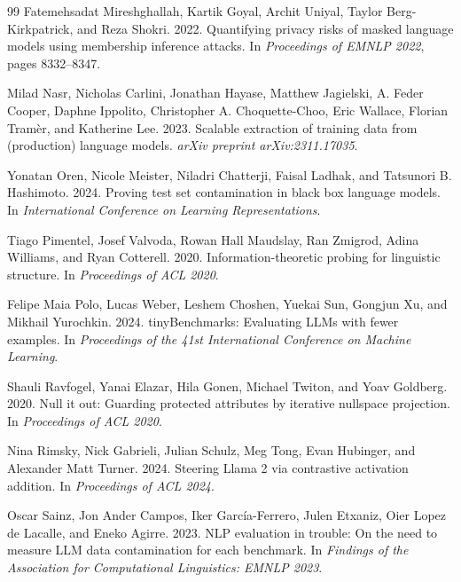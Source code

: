 \documentclass[10pt,twocolumn,letterpaper]{article}
\begin{document}
\begin{thebibliography}{99}
Fatemehsadat Mireshghallah, Kartik Goyal, Archit Uniyal, Taylor Berg-Kirkpatrick, and Reza Shokri. 2022.
Quantifying privacy risks of masked language models using membership inference attacks.
In \emph{Proceedings of EMNLP 2022}, pages 8332--8347.

Milad Nasr, Nicholas Carlini, Jonathan Hayase, Matthew Jagielski, A. Feder Cooper, Daphne Ippolito, Christopher A. Choquette-Choo, Eric Wallace, Florian Tram\`er, and Katherine Lee. 2023.
Scalable extraction of training data from (production) language models.
\emph{arXiv preprint arXiv:2311.17035}.

Yonatan Oren, Nicole Meister, Niladri Chatterji, Faisal Ladhak, and Tatsunori B. Hashimoto. 2024.
Proving test set contamination in black box language models.
In \emph{International Conference on Learning Representations}.

Tiago Pimentel, Josef Valvoda, Rowan Hall Maudslay, Ran Zmigrod, Adina Williams, and Ryan Cotterell. 2020.
Information-theoretic probing for linguistic structure.
In \emph{Proceedings of ACL 2020}.

Felipe Maia Polo, Lucas Weber, Leshem Choshen, Yuekai Sun, Gongjun Xu, and Mikhail Yurochkin. 2024.
tinyBenchmarks: Evaluating LLMs with fewer examples.
In \emph{Proceedings of the 41st International Conference on Machine Learning}.

Shauli Ravfogel, Yanai Elazar, Hila Gonen, Michael Twiton, and Yoav Goldberg. 2020.
Null it out: Guarding protected attributes by iterative nullspace projection.
In \emph{Proceedings of ACL 2020}.

Nina Rimsky, Nick Gabrieli, Julian Schulz, Meg Tong, Evan Hubinger, and Alexander Matt Turner. 2024.
Steering Llama 2 via contrastive activation addition.
In \emph{Proceedings of ACL 2024}.

Oscar Sainz, Jon Ander Campos, Iker Garc\'ia-Ferrero, Julen Etxaniz, Oier Lopez de Lacalle, and Eneko Agirre. 2023.
NLP evaluation in trouble: On the need to measure LLM data contamination for each benchmark.
In \emph{Findings of the Association for Computational Linguistics: EMNLP 2023}.


\end{thebibliography}
\end{document}
